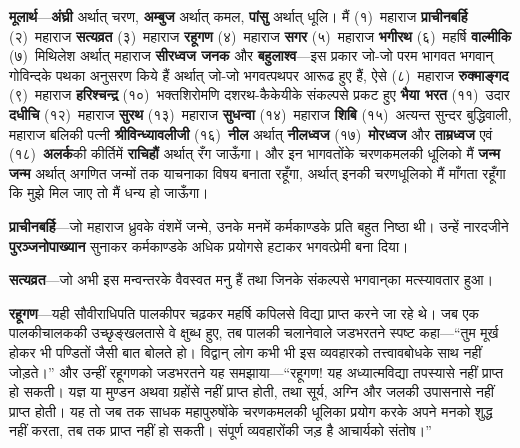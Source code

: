 \begin{sloppypar}\justifying{}
\textbf{मूलार्थ}—\textbf{अंघ्री} अर्थात् चरण, \textbf{अम्बुज} अर्थात् कमल, \textbf{पांसु} अर्थात् धूलि। मैं (१)~महाराज \textbf{प्राचीनबर्हि} (२)~महाराज \textbf{सत्यव्रत} (३)~महाराज \textbf{रहूगण} (४)~महाराज \textbf{सगर} (५)~महाराज \textbf{भगीरथ} (६)~महर्षि \textbf{वाल्मीकि} (७)~मिथिलेश अर्थात् महाराज \textbf{सीरध्वज जनक} और \textbf{बहुलाश्व}—इस प्रकार जो-जो परम भागवत भगवान् गोविन्दके पथका अनुसरण किये हैं अर्थात् जो-जो भगवत्पथपर आरूढ हुए हैं, ऐसे (८)~महाराज \textbf{रुक्माङ्गद} (९)~महाराज \textbf{हरिश्चन्द्र} (१०)~भक्तशिरोमणि दशरथ-कैकेयीके संकल्पसे प्रकट हुए \textbf{भैया भरत} (११)~उदार \textbf{दधीचि} (१२)~महाराज \textbf{सुरथ} (१३)~महाराज \textbf{सुधन्वा} (१४)~महाराज \textbf{शिबि} (१५)~अत्यन्त सुन्दर बुद्धिवाली, महाराज बलिकी पत्नी \textbf{श्रीविन्ध्यावलीजी} (१६)~\textbf{नील} अर्थात् \textbf{नीलध्वज} (१७)~\textbf{मोरध्वज} और \textbf{ताम्रध्वज} एवं (१८)~\textbf{अलर्क}की कीर्तिमें \textbf{राचिहौं} अर्थात् रँग जाऊँगा। और इन भागवतोंके चरणकमलकी धूलिको मैं \textbf{जन्म जन्म} अर्थात् अगणित जन्मों तक याचनाका विषय बनाता रहूँगा, अर्थात् इनकी चरणधूलिको मैं माँगता रहूँगा कि मुझे मिल जाए तो मैं धन्य हो जाऊँगा।
\end{sloppypar}
\begin{sloppypar}\justifying{}
\textbf{प्राचीनबर्हि}—जो महाराज ध्रुवके वंशमें जन्मे, उनके मनमें कर्मकाण्डके प्रति बहुत निष्ठा थी। उन्हें नारदजीने \textbf{पुरञ्जनोपाख्यान} सुनाकर कर्मकाण्डके अधिक प्रयोगसे हटाकर भगवत्प्रेमी बना दिया।
\end{sloppypar}
\begin{sloppypar}\justifying{}
\textbf{सत्यव्रत}—जो अभी इस मन्वन्तरके वैवस्वत मनु हैं तथा जिनके संकल्पसे भगवान्‌का मत्स्यावतार हुआ।
\end{sloppypar}
\begin{sloppypar}\justifying{}
\textbf{रहूगण}—यही सौवीराधिपति पालकीपर चढ़कर महर्षि कपिलसे विद्या प्राप्त करने जा रहे थे। जब एक पालकी\-चालककी उच्छृङ्खलतासे वे क्षुब्ध हुए, तब पालकी चलानेवाले जडभरतने स्पष्ट कहा—“तुम मूर्ख होकर भी पण्डितों जैसी बात बोलते हो। विद्वान् लोग कभी भी इस व्यवहारको तत्त्वावबोधके साथ नहीं जोड़ते।” और उन्हीं रहूगणको जडभरतने यह समझाया—“रहूगण! यह अध्यात्म\-विद्या तपस्यासे नहीं प्राप्त हो सकती। यज्ञ या मुण्डन अथवा ग्रहोंसे नहीं प्राप्त होती, तथा सूर्य, अग्नि और जलकी उपासनासे नहीं प्राप्त होती। यह तो जब तक साधक महापुरुषोंके चरणकमलकी धूलिका प्रयोग करके अपने मनको शुद्ध नहीं करता, तब तक प्राप्त नहीं हो सकती। संपूर्ण व्यवहारोंकी जड़ है आचार्यको संतोष।”
\end{sloppypar}
